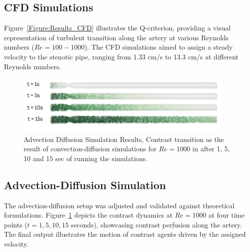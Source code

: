 \documentclass[times,twocolumn,final]{elsarticle}
\begin{document}
\subsection{CFD Simulations}
Figure~\ref{Figure:Results_CFD} illustrates the Q-criterion, providing a visual representation of turbulent transition along the artery at various Reynolds numbers ($Re = 100-1000$). The CFD simulations aimed to assign a steady velocity to the stenotic pipe, ranging from 1.33 cm/s to 13.3 cm/s at different Reynolds numbers.
\begin{figure}[!t]
    \centering
    \includegraphics[width=0.95\textwidth]{./Figures/Figure3_results_advection_diffusion.png}
    \caption{Advection Diffusion Simulation Results, Contrast transition as the result of convection-diffusion simulations for $Re=1000$ in after 1, 5, 10 and 15 sec of running the simulations.}
    \label{Figure:Results_AdvDiff}
    \end{figure}
\subsection{Advection-Diffusion Simulation}
The advection-diffusion setup was adjusted and validated against theoretical formulations. Figure~\ref{Figure:Results_AdvDiff} depicts the contrast dynamics at $Re = 1000$ at four time points ($t = 1, 5, 10, 15$ seconds), showcasing contrast perfusion along the artery. The final output illustrates the motion of contrast agents driven by the assigned velocity.
\end{document}
